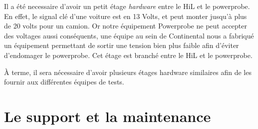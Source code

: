 \begin{remarque}
Il a été necessaire d'avoir un petit étage \textit{hardware} entre le HiL et le powerprobe. En effet, le signal clé d'une voiture est en 13 Volts, et peut monter jusqu'à plus de 20 volts pour un camion. Or notre équipement Powerprobe ne peut accepter des voltages aussi conséquents, une équipe au sein de Continental nous a fabriqué un équipement permettant de sortir une tension bien plus faible afin d'éviter d'endomager le powerprobe. Cet étage est branché entre le HiL et le powerprobe. 

À terme, il sera nécessaire d'avoir plusieurs étages hardware similaires afin de les fournir aux différentes équipes de tests.
\end{remarque}


\section{Le support et la maintenance}
